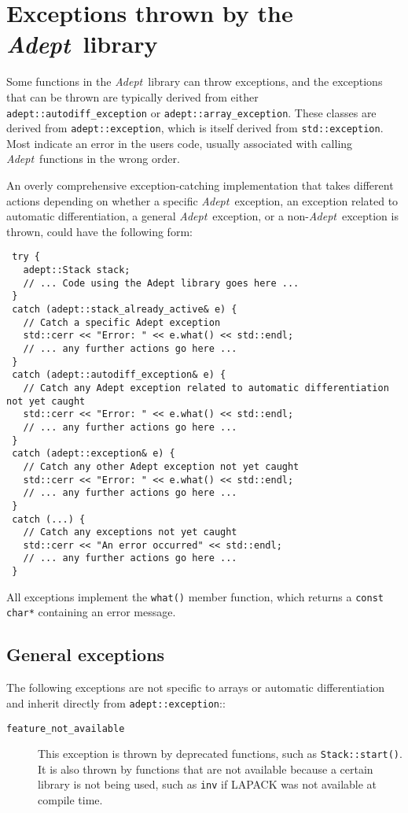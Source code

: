 \documentclass[a4,oneside]{book}
\def\codesize{\small}
\def\Adept{\emph{Adept}}
\def\code#1{{\codesize\texttt{#1}}}
\def\citem#1{\item[{\codesize\texttt{#1}}]}
\begin{document}
\section{Exceptions thrown by the \Adept\ library}
\label{sec:exceptions}
Some functions in the \Adept\ library can throw exceptions, and the
exceptions that can be thrown are typically derived from either
\code{adept::autodiff\_exception} or
\code{adept::array\_exception}. These classes are derived from
\code{adept::exception}, which is itself derived from
\code{std::exception}. Most indicate an error in the users code,
usually associated with calling \Adept\ functions in the wrong order.

An overly comprehensive exception-catching implementation that takes
different actions depending on whether a specific \Adept\ exception,
an exception related to automatic differentiation, a general
\Adept\ exception, or a non-\Adept\ exception is thrown, could have
the following form:
%
\begin{lstlisting}
 try {
   adept::Stack stack;
   // ... Code using the Adept library goes here ...
 }
 catch (adept::stack_already_active& e) {
   // Catch a specific Adept exception
   std::cerr << "Error: " << e.what() << std::endl;
   // ... any further actions go here ...
 }
 catch (adept::autodiff_exception& e) {
   // Catch any Adept exception related to automatic differentiation not yet caught
   std::cerr << "Error: " << e.what() << std::endl;
   // ... any further actions go here ...
 }
 catch (adept::exception& e) {
   // Catch any other Adept exception not yet caught
   std::cerr << "Error: " << e.what() << std::endl;
   // ... any further actions go here ...
 }
 catch (...) {
   // Catch any exceptions not yet caught
   std::cerr << "An error occurred" << std::endl;
   // ... any further actions go here ...
 }
\end{lstlisting}
%
All exceptions implement the \code{what()} member function, which
returns a \code{const char*} containing an error message. 

\subsection{General exceptions}
The following exceptions are not specific to arrays or automatic
differentiation and inherit directly from \code{adept::exception}::
\begin{description}
\citem{feature\_not\_available} This exception is thrown by deprecated
functions, such as \code{Stack::start()}. It is also thrown by
functions that are not available because a certain library is not
being used, such as \code{inv} if LAPACK was not available at compile
time.
\end{description}
\end{document}
